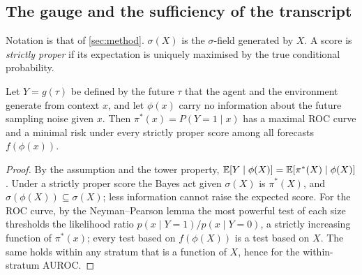 \subsection{The gauge and the sufficiency of the transcript}
Notation is that of \cref{sec:method}. $\sigma(X)$ is the $\sigma$-field generated by $X$. A score is \emph{strictly proper}
if its expectation is uniquely maximised by the true conditional probability.

\begin{proposition}\label{prop:behaviour}
Let $Y=g(\tau)$ be defined by the future $\tau$ that the agent and the environment generate from context $x$, and let
$\phi(x)$ carry no information about the future sampling noise given $x$. Then $\pi^*(x)=P(Y=1\mid x)$ has a maximal ROC curve
and a minimal risk under every strictly proper score among all forecasts $f(\phi(x))$.
\end{proposition}
\begin{proof}
By the assumption and the tower property, $\mathbb{E}[Y\mid\phi(X)]=\mathbb{E}[\pi^*(X)\mid\phi(X)]$. Under a strictly proper
score the Bayes act given $\sigma(X)$ is $\pi^*(X)$, and $\sigma(\phi(X))\subseteq\sigma(X)$; less information cannot raise the
expected score. For the ROC curve, by the Neyman--Pearson lemma the most powerful test of each size thresholds the likelihood
ratio $p(x\mid Y{=}1)/p(x\mid Y{=}0)$, a strictly increasing function of $\pi^*(x)$; every test based on $f(\phi(X))$ is a test
based on $X$. The same holds within any stratum that is a function of $X$, hence for the within-stratum AUROC.
\end{proof}

